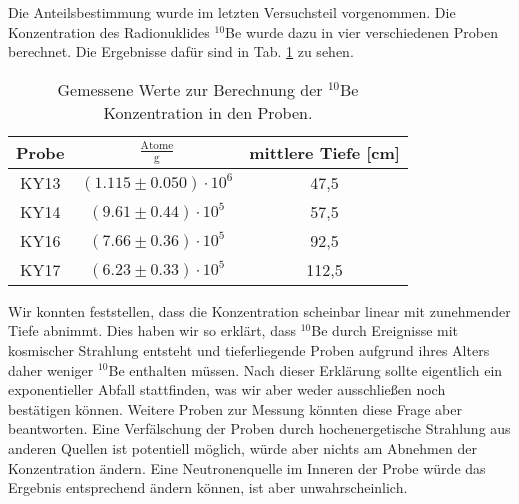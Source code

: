 Die Anteilsbestimmung wurde im letzten Versuchsteil vorgenommen.
Die Konzentration des Radionuklides $^{10}$Be wurde dazu in vier verschiedenen Proben berechnet.
Die Ergebnisse dafür sind in Tab. \ref{dis_con} zu sehen.
\begin{table}[h]
\centering
\caption{Gemessene Werte zur Berechnung der $^{10}$Be Konzentration in den Proben.}
\begin{tabular}{|c |c| c|}
\hline
Probe& $\frac{\text{Atome}}{\si{\gram}}$ & mittlere Tiefe [cm] \\
\hline
KY13 &  $(\num{1.115} \pm \num{0.050}) \cdot 10^{6} $ & 47,5\\
KY14 &  $(\num{9.61} \pm \num{0.44}) \cdot 10^{5} $ & 57,5 \\
KY16 &  $(\num{7.66} \pm \num{0.36}) \cdot 10^{5} $ & 92,5\\
KY17 &  $(\num{6.23} \pm \num{0.33}) \cdot 10^{5} $ & 112,5\\
\hline
\end{tabular}
\label{dis_con}
\end{table}
Wir konnten feststellen, dass die Konzentration scheinbar linear mit zunehmender Tiefe abnimmt.
Dies haben wir so erklärt, dass $^{10}$Be durch Ereignisse mit kosmischer Strahlung entsteht und tieferliegende Proben aufgrund ihres Alters daher weniger $^{10}$Be enthalten müssen.
Nach dieser Erklärung sollte eigentlich ein exponentieller Abfall stattfinden, was wir aber weder ausschließen noch bestätigen können.
Weitere Proben zur Messung könnten diese Frage aber beantworten.
Eine Verfälschung der Proben durch hochenergetische Strahlung aus anderen Quellen ist potentiell möglich, würde aber nichts am Abnehmen der Konzentration ändern.
Eine Neutronenquelle im Inneren der Probe würde das Ergebnis entsprechend ändern können, ist aber unwahrscheinlich.
